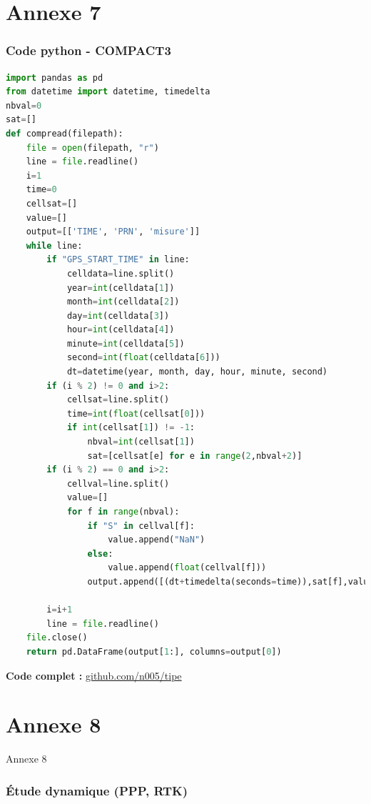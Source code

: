 \documentclass[xcolor=dvipsnames,envcountsect]{beamer}
\begin{document}
\section{Annexe 7}
\begin{frame}
	\frametitle{Code python - COMPACT3}
	\noindent
	\begin{lstlisting}[language=Python,basicstyle=\tiny]
import pandas as pd
from datetime import datetime, timedelta
nbval=0
sat=[]
def compread(filepath):
	file = open(filepath, "r")
	line = file.readline()
	i=1
	time=0
	cellsat=[]
	value=[]
	output=[['TIME', 'PRN', 'misure']]
	while line:
		if "GPS_START_TIME" in line:
			celldata=line.split()
			year=int(celldata[1])
			month=int(celldata[2])
			day=int(celldata[3])
			hour=int(celldata[4])
			minute=int(celldata[5])
			second=int(float(celldata[6]))
			dt=datetime(year, month, day, hour, minute, second)
		if (i % 2) != 0 and i>2:
			cellsat=line.split()
			time=int(float(cellsat[0]))
			if int(cellsat[1]) != -1:
				nbval=int(cellsat[1])
				sat=[cellsat[e] for e in range(2,nbval+2)]
		if (i % 2) == 0 and i>2:
			cellval=line.split()
			value=[]
			for f in range(nbval):
				if "S" in cellval[f]:
					value.append("NaN")
				else:
					value.append(float(cellval[f]))
				output.append([(dt+timedelta(seconds=time)),sat[f],value[f]])
		
		i=i+1
		line = file.readline()
	file.close()   
	return pd.DataFrame(output[1:], columns=output[0])
	\end{lstlisting}
	\textbf{Code complet :} \url{github.com/n005/tipe}
\end{frame}

\section{Annexe 8}
\begin{frame}{Annexe 8}
	\frametitle{Étude dynamique (PPP, RTK)}
\end{frame}
\end{document}
